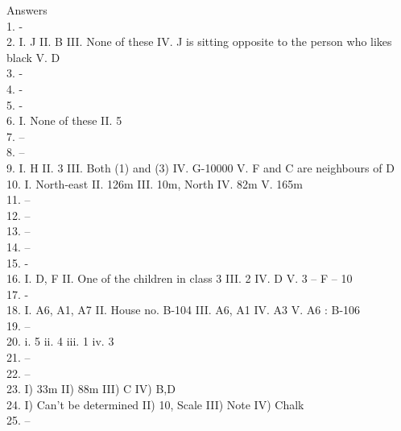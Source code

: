 \documentclass[
]{article}
\begin{document}
Answers\\
1. -\\
2. I. J \hspace{2mm}II. B \hspace{2mm}III. None of these
\hspace{2mm}IV. J is sitting opposite to the person who likes black \hspace{2mm}V. D\\
3. -\\
4. -\\
5. -\\
6. I. None of these \hspace{2mm}II. 5\\
7. –\\
8. –\\
9. I. H \hspace{2mm}II. 3 \hspace{2mm}III. Both (1) and (3) \hspace{2mm}IV. G-10000
\hspace{2mm}V. F and C are neighbours of D\\
10. I. North-east \hspace{2mm}II. 126m \hspace{2mm}III. 10m, North \hspace{2mm}IV. 82m \hspace{2mm}V. 165m\\
11. –\\
12. –\\
13. –\\
14. –\\
15. -\\
16. I. D, F \hspace{2mm}II. One of the children in class 3 \hspace{2mm}III. 2 \hspace{2mm}IV. D \hspace{2mm}V. 3 – F – 10\\
17. -\\
18. I. A6, A1, A7 \hspace{2mm}II. House no. B-104 \hspace{2mm}III. A6, A1 \hspace{2mm}IV. A3 \hspace{2mm}V. A6 : B-106\\
19. –\\
20. i. 5 \hspace{2mm}ii. 4 \hspace{2mm}iii. 1 \hspace{2mm}iv. 3\\
21. –\\
22. –\\
23. I) 33m \hspace{2mm}II) 88m \hspace{2mm}III) C \hspace{2mm}IV) B,D\\
24. I) Can’t be determined \hspace{2mm}II) 10, Scale \hspace{2mm}III) Note \hspace{2mm}IV) Chalk\\
25. --\\
\end{document}
